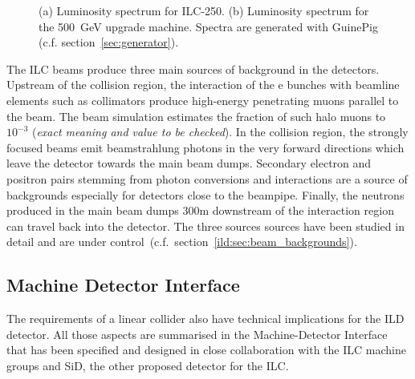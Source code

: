 \begin{figure}[htbp]
\begin{subfigure}{0.49\hsize}
 \caption{  \label{fig:ilc:ecmspect-500}}
 \end{subfigure}
\caption{
(a) Luminosity spectrum for ILC-250.
(b) Luminosity spectrum for the 500~GeV upgrade machine.
Spectra are generated with GuinePig (c.f. section~\ref{sec:generator}).
}
\label{fig:ilc:ecmspect}
\end{figure}

The ILC beams produce three main sources of background in the detectors. Upstream of the collision region, the interaction of the e bunches with beamline elements such as collimators produce high-energy penetrating muons parallel to the beam. The beam simulation estimates the fraction of such halo muons to $10^{-3}$ (\textit{exact meaning and value to be checked}). In the collision region, the strongly focused beams emit beamstrahlung photons in the very forward directions which leave the detector towards the main beam dumps. Secondary electron and positron pairs stemming from photon conversions and interactions are a source of backgrounds especially for detectors close to the beampipe. Finally, the neutrons produced in the main beam dumps 300m downstream of the interaction region can travel back into the detector. The three sources sources have been studied in detail and are under control~(c.f.~section~\ref{ild:sec:beam_backgrounds}).

\subsection{Machine Detector Interface}
The requirements of a linear collider also have technical implications for the ILD detector. All those aspects are summarised in the Machine-Detector Interface that has been specified and designed in close collaboration with the ILC machine groups and SiD, the other proposed detector for the ILC.
